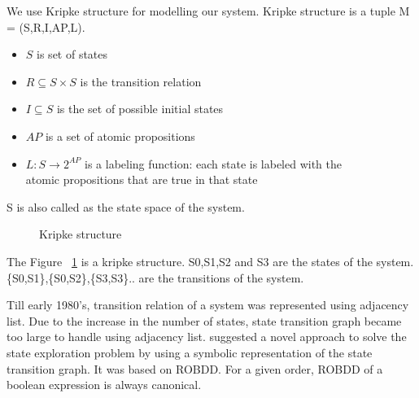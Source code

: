 We use Kripke structure for modelling our system. Kripke structure is a tuple M = (S,R,I,AP,L).
\begin{itemize}
\item $S$ is set of states
\item $R\subseteq S\times S$ is the transition relation
\item $I\subseteq S$ is the set of possible initial states
\item $AP$ is a set of atomic propositions
\item $L:S\rightarrow 2^{AP}$ is a labeling function: each state is labeled with the\\ atomic propositions that are true in that state
\end{itemize}
S is also called as the state space of the system.
\newline

\begin{figure}
\centering
{}
\caption{Kripke structure} \label{kripke structure}
\end{figure}


The Figure ~\ref{kripke structure} is a kripke structure. S0,S1,S2 and S3 are the states of the system. \{S0,S1\},\{S0,S2\},\{S3,S3\}.. are the transitions of the system.
\newline

Till early 1980's, transition relation of a system was represented using adjacency list\cite{Clarke 2008}.  Due to the increase in the number of states, state transition graph became too large to handle using adjacency list. \cite{McMillian 1993} suggested a novel approach to solve the state exploration problem by using a symbolic representation of the state transition graph. It was based on ROBDD. For a given order, ROBDD of a boolean expression is always canonical\cite{Bryant 1986}.
